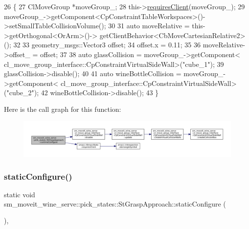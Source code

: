 \begin{DoxyCode}
26             \{
27                 ClMoveGroup *moveGroup\_;
28                 this->\hyperlink{classsmacc_1_1ISmaccState_a7f95c9f0a6ea2d6f18d1aec0519de4ac}{requiresClient}(moveGroup\_);
29                 moveGroup\_->getComponent<CpConstraintTableWorkspaces>()->setSmallTableCollisionVolume();
30 
31                 \textcolor{keyword}{auto} moveRelative = this->getOrthogonal<OrArm>()->
      getClientBehavior<CbMoveCartesianRelative2>();
32 
33                 geometry\_msgs::Vector3 offset;
34                 offset.x = 0.11;
35 
36                 moveRelative->offset\_ = offset;
37 
38                 \textcolor{keyword}{auto} glassCollision = moveGroup\_->getComponent<
      cl\_move\_group\_interface::CpConstraintVirtualSideWall>(\textcolor{stringliteral}{"cube\_1"});
39                 glassCollision->disable();
40 
41                 \textcolor{keyword}{auto} wineBottleCollision = moveGroup\_->getComponent<
      cl\_move\_group\_interface::CpConstraintVirtualSideWall>(\textcolor{stringliteral}{"cube\_2"});
42                 wineBottleCollision->disable();
43             \}
\end{DoxyCode}
Here is the call graph for this function\+:
\nopagebreak
\begin{figure}[H]
\begin{center}
\leavevmode
\includegraphics[width=350pt]{structsm__moveit__wine__serve_1_1pick__states_1_1StGraspApproach_a9d2a2d94d77142a50e9a348818c81217_cgraph}
\end{center}
\end{figure}
\mbox{\label{structsm__moveit__wine__serve_1_1pick__states_1_1StGraspApproach_afb4bc374805d50d66112c082b230265f}} 
\subsubsection{\texorpdfstring{static\+Configure()}{staticConfigure()}}
{\footnotesize\ttfamily static void sm\+\_\+moveit\+\_\+wine\+\_\+serve\+::pick\+\_\+states\+::\+St\+Grasp\+Approach\+::static\+Configure (\begin{DoxyParamCaption}{ }\end{DoxyParamCaption})\hspace{0.3cm}{\ttfamily [inline]}, {\ttfamily [static]}}



